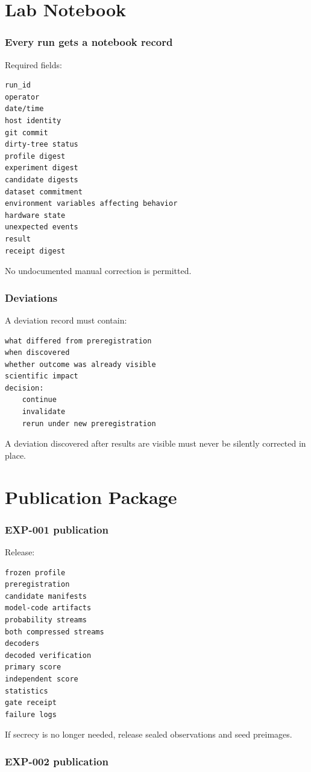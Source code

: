 \documentclass[11pt]{article}
\begin{document}
\part{Lab Notebook}

\section{Every run gets a notebook record}

Required fields:
\begin{verbatim}
run_id
operator
date/time
host identity
git commit
dirty-tree status
profile digest
experiment digest
candidate digests
dataset commitment
environment variables affecting behavior
hardware state
unexpected events
result
receipt digest
\end{verbatim}
No undocumented manual correction is permitted.

\section{Deviations}

A deviation record must contain:
\begin{verbatim}
what differed from preregistration
when discovered
whether outcome was already visible
scientific impact
decision:
    continue
    invalidate
    rerun under new preregistration
\end{verbatim}
A deviation discovered after results are visible must never be silently corrected in place.

\part{Publication Package}

\section{EXP-001 publication}

Release:
\begin{verbatim}
frozen profile
preregistration
candidate manifests
model-code artifacts
probability streams
both compressed streams
decoders
decoded verification
primary score
independent score
statistics
gate receipt
failure logs
\end{verbatim}
If secrecy is no longer needed, release sealed observations and seed preimages.

\section{EXP-002 publication}
\end{document}

